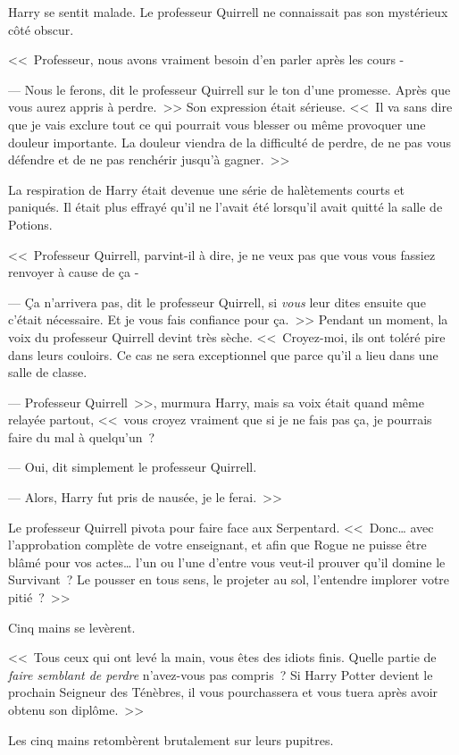 Harry se sentit malade. Le professeur Quirrell ne connaissait pas son mystérieux côté obscur.

<<~Professeur, nous avons vraiment besoin d'en parler après les cours -

--- Nous le ferons, dit le professeur Quirrell sur le ton d'une promesse. Après que vous aurez appris à perdre.~>> Son expression était sérieuse. <<~Il va sans dire que je vais exclure tout ce qui pourrait vous blesser ou même provoquer une douleur importante. La douleur viendra de la difficulté de perdre, de ne pas vous défendre et de ne pas renchérir jusqu'à gagner.~>>

La respiration de Harry était devenue une série de halètements courts et paniqués. Il était plus effrayé qu'il ne l'avait été lorsqu'il avait quitté la salle de Potions.

<<~Professeur Quirrell, parvint-il à dire, je ne veux pas que vous vous fassiez renvoyer à cause de ça -

--- Ça n'arrivera pas, dit le professeur Quirrell, si \emph{vous} leur dites ensuite que c'était nécessaire. Et je vous fais confiance pour ça.~>> Pendant un moment, la voix du professeur Quirrell devint très sèche. <<~Croyez-moi, ils ont toléré pire dans leurs couloirs. Ce cas ne sera exceptionnel que parce qu'il a lieu dans une salle de classe.

--- Professeur Quirrell~>>, murmura Harry, mais sa voix était quand même relayée partout, <<~vous croyez vraiment que si je ne fais pas ça, je pourrais faire du mal à quelqu'un~?

--- Oui, dit simplement le professeur Quirrell.

--- Alors, Harry fut pris de nausée, je le ferai.~>>

Le professeur Quirrell pivota pour faire face aux Serpentard. <<~Donc… avec l'approbation complète de votre enseignant, et afin que Rogue ne puisse être blâmé pour vos actes… l'un ou l'une d'entre vous veut-il prouver qu'il domine le Survivant~? Le pousser en tous sens, le projeter au sol, l'entendre implorer votre pitié~?~>>

Cinq mains se levèrent.

<<~Tous ceux qui ont levé la main, vous êtes des idiots finis. Quelle partie de \emph{faire semblant de perdre} n'avez-vous pas compris~? Si Harry Potter devient le prochain Seigneur des Ténèbres, il vous pourchassera et vous tuera après avoir obtenu son diplôme.~>>

Les cinq mains retombèrent brutalement sur leurs pupitres.

